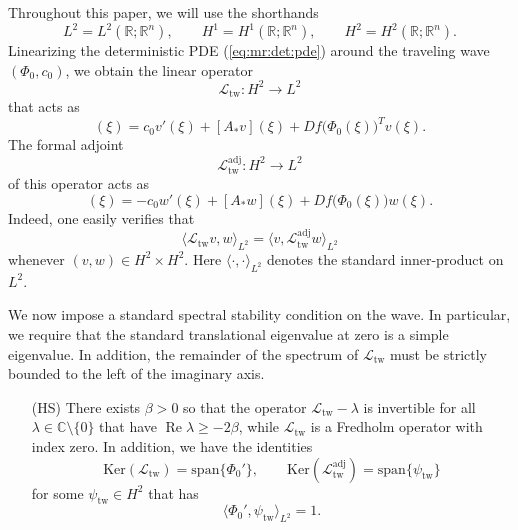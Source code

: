 \documentclass[10pt]{articleHJ}
\def\Re{\mathop\mathrm{Re}\nolimits}			%
\newcommand{\Real}{\mathbb{R}}							%
\newcommand{\sref}[1]{(\ref{#1})}                       %
\numberwithin{equation}{section}
\begin{document}
Throughout this paper, we will use the shorthands
\begin{equation}
L^2 = L^2(\Real;\Real^n),
\qquad
H^1 = H^1(\Real ;\Real^n),
\qquad
H^2 = H^2(\Real; \Real^n).
\end{equation}
Linearizing the deterministic PDE
\sref{eq:mr:det:pde} around
the traveling wave $(\Phi_{0} , c_0)$,
we obtain the linear operator
\begin{equation}
\mathcal{L}_{\mathrm{tw}}: H^2 \to L^2
\end{equation}
that acts as
\begin{equation}
[\mathcal{L}_{\mathrm{tw}} v](\xi) =
c_0 v'(\xi) + [A_* v](\xi) + Df\big(\Phi_0(\xi) \big)^T v(\xi) .
\end{equation}
The formal adjoint
\begin{equation}
\mathcal{L}_{\mathrm{tw}}^{\mathrm{adj}}: H^2 \to L^2
\end{equation}
of this operator acts as
\begin{equation}
[\mathcal{L}_{\mathrm{tw}}^{\mathrm{adj}} w](\xi) =
-c_0 w'(\xi) + [A_* w](\xi) + Df\big(\Phi_0(\xi) \big) w(\xi) .
\end{equation}
Indeed, one easily verifies that
\begin{equation}
\langle \mathcal{L}_{\mathrm{tw}} v , w \rangle_{L^2}
= \langle v, \mathcal{L}_{\mathrm{tw}}^{\mathrm{adj}} w \rangle_{L^2}
\end{equation}
whenever $(v,w) \in H^2 \times H^2$. Here $\langle \cdot, \cdot \rangle_{L^2}$
denotes the standard inner-product on $L^2$.

We now impose a standard spectral stability condition
on the wave. In particular, we require
that the standard translational eigenvalue
at zero is a simple eigenvalue. In addition,
the remainder of the spectrum of $\mathcal{L}_{\mathrm{tw}}$
must be strictly bounded to the left of the imaginary axis.
\begin{itemize}
\item[(HS)]{
  There exists $\beta > 0$ so that
  the operator $\mathcal{L}_{\mathrm{tw}} - \lambda$
  is invertible for all $\lambda \in \mathbb{C} \setminus \{0 \}$
  that have $\Re \lambda \ge - 2 \beta$,
  while $\mathcal{L}_{\mathrm{tw}}$ is a Fredholm operator
  with index zero. In addition, we have the identities
  \begin{equation}
  \mathrm{Ker}( \mathcal{L}_{\mathrm{tw}} ) = \mathrm{span} \{ \Phi_0' \},
  \qquad
  \mathrm{Ker}( \mathcal{L}_{\mathrm{tw}}^{\mathrm{adj}} )
    = \mathrm{span} \{ \psi_{\mathrm{tw}} \}
  \end{equation}
  for some $\psi_{\mathrm{tw}} \in H^2$ that has
  \begin{equation}
    \label{eq:mr:hs:norm:cnd:psitw}
     \langle \Phi_0' , \psi_{\mathrm{tw}} \rangle_{L^2} = 1.
  \end{equation}
}
\end{itemize}
\end{document}
